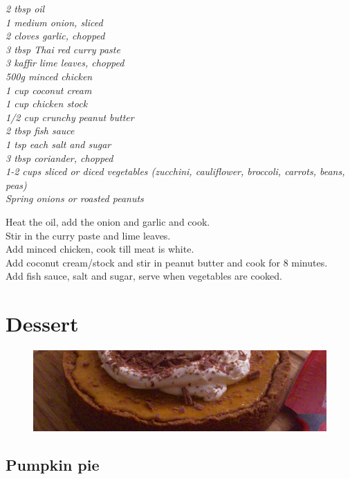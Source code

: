 \documentclass{tufte-book}
\begin{document}
\emph{2 tbsp oil
\\1 medium onion, sliced
\\2 cloves garlic, chopped
\\3 tbsp Thai red curry paste
\\3 kaffir lime leaves, chopped
\\500g minced chicken
\\1 cup coconut cream
\\1 cup chicken stock
\\1/2 cup crunchy peanut butter
\\2 tbsp fish sauce
\\1 tsp each salt and sugar
\\3 tbsp coriander, chopped
\\1-2 cups sliced or diced vegetables (zucchini, cauliflower, broccoli, carrots, beans, peas)
\\Spring onions or roasted peanuts}

\smallskip
Heat the oil, add the onion and garlic and cook.
\\Stir in the curry paste and lime leaves.
\\Add minced chicken, cook till meat is white.
\\Add coconut cream/stock and stir in peanut butter and cook for 8 minutes.
\\Add fish sauce, salt and sugar, serve when vegetables are cooked.

\chapter{Dessert}

\begin{figure}[h]
  \includegraphics[width=\linewidth]{pumpkinpie.jpg}%
\end{figure}

\section{Pumpkin pie}
\end{document}

